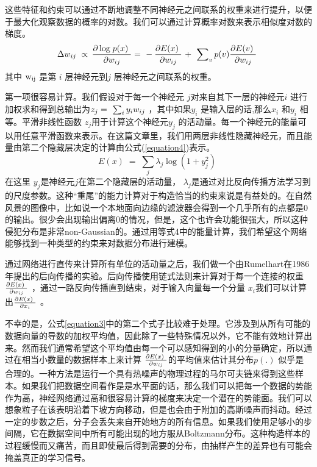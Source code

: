 \par{这些特征和约束可以通过不断地调整不同神经元之间联系的权重来进行提升，以便于最大化观察数据的概率的对数。我们可以通过计算概率对数来表示相似度对数的梯度。
 \begin{equation}\label{equation3}\Delta {w_{ij}}{\kern 1pt} {\kern 1pt} {\kern 1pt}  \propto {\kern 1pt} {\kern 1pt} \frac{{\partial \log {\kern 1pt} p(x){\kern 1pt} {\kern 1pt} {\kern 1pt} }}{{\partial {w_{ij}}}} = {\kern 1pt}  - \frac{{\partial E(x){\kern 1pt} {\kern 1pt} {\kern 1pt} }}{{\partial {w_{ij}}}}{\kern 1pt}  + {\kern 1pt} {\kern 1pt} \sum\nolimits_v {p(v)\frac{{\partial E(v){\kern 1pt} {\kern 1pt} {\kern 1pt} }}{{\partial {w_{ij}}}}} \;\end{equation}
其中 ${{\rm{w}}_{{\rm{ij}}}}$ 是第 $i$ 层神经元到$j$  层神经元之间联系的权重。}
	\par{第一项很容易计算。我们假设对于每一个神经元 $j$对来自其下一层的神经元$i$ 进行加权求和得到总输出为${z_j} = {\kern 1pt} {\kern 1pt} \sum\nolimits_i {{y_i}{w_{ij}}} $ ，其中如果${y_i}$ 是输入层的话,那么${x_i}$ 和${y_i}$ 相等。平滑非线性函数 ${z_j}$用于计算这个神经元${y_j}$ 的活动量。每一个神经元的能量可以用任意平滑函数来表示。在这篇文章里，我们用两层非线性隐藏神经元，而且能量由第二个隐藏层决定的计算由公式(\ref{equation4})表示。
 \begin{equation}\label{equation4}E(x)\; = \;\sum\limits_j {{\lambda _j}\log (1 + y_j^2)} \;\end{equation}
在这里 ${y_j}$是神经元$j$在第二个隐藏层的活动量， ${\lambda _j}$是通过对比反向传播方法学习到的尺度参数。这种“重尾”的能力计算对于构造恰当的约束来说是有益处的。在自然风景的图像中，比如说一个本地面向边缘的滤波器会得到一个几乎所有的点都是0 的输出。很少会出现输出偏离0的情况，但是，这个也许会功能很强大，所以这种侵犯分布是非常non-Gaussian的。通过用等式4中的能量计算，我们希望这个网络能够找到一种类型的约束来对数据分布进行建模。}
\par{通过网络进行直传来计算所有单位的活动量之后，我们做一个由Rumelhart在1986 年提出的后向传播的实验。后向传播使用链式法则来计算对于每一个连接的权重 $\frac{{\partial E(x){\kern 1pt} {\kern 1pt} {\kern 1pt} }}{{\partial {w_{ij}}}}$ ，通过一路反向传播直到结束，对于输入向量每一个分量 ${x_i}$我们可以计算出$\frac{{\partial E(x){\kern 1pt} {\kern 1pt} {\kern 1pt} }}{{\partial {x_i}}}$ 。}
\par{不幸的是，公式\ref{equation3}中的第二个式子比较难于处理。它涉及到从所有可能的数据向量的导数的加权平均值，因此除了一些特殊情况以外，它不能有效地计算出来。然而我们通常希望这个平均值由每一个可以感知得到的小的分量确定，所以通过在相当小数量的数据样本上来计算 $\frac{{\partial E(x){\kern 1pt} {\kern 1pt} {\kern 1pt} }}{{\partial {w_{ij}}}}$的平均值来估计其分布$p\left( . \right)$  似乎是合理的。一种方法是运行一个具有热噪声的物理过程的马尔可夫链来得到这些样本。如果我们把数据空间看作是是水平面的话，那么我们可以把每一个数据的势能作为高，神经网络通过高和很容易计算的梯度来决定一个潜在的势能面。我们可以想象粒子在该表明沿着下坡方向移动，但是也会由于附加的高斯噪声而抖动。经过一定的步数之后，分子会丢失来自开始地方的所有信息。如果我们使用足够小的步间隔，它在数据空间中所有可能出现的地方服从Boltzmann分布。这种构造样本的过程缓慢而又痛苦，而且即使最后得到需要的分布，由抽样产生的差异也有可能会掩盖真正的学习信号。}

